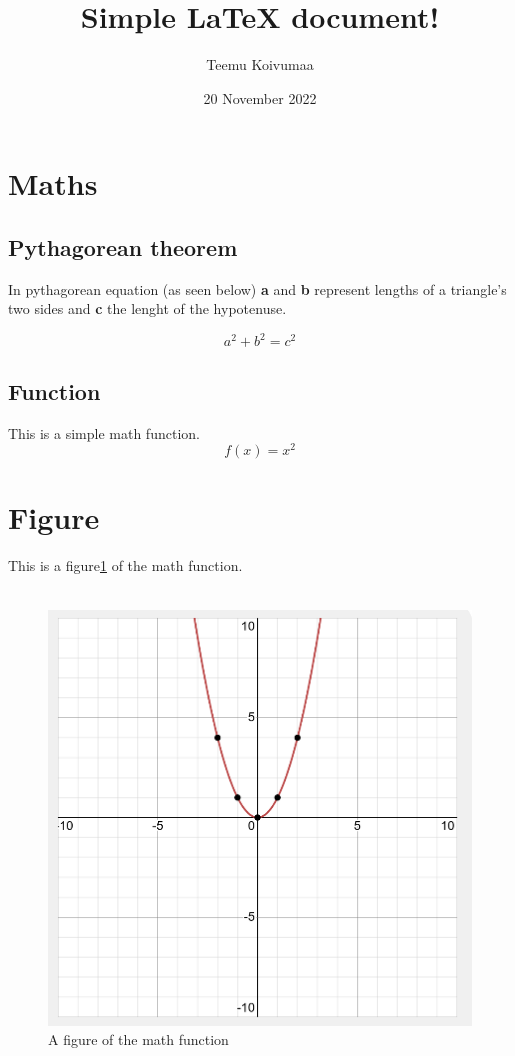 \documentclass{article}
\title{Simple LaTeX document!}
\author{Teemu Koivumaa}
\date{20 November 2022}
\begin{document}
\maketitle
\thispagestyle{empty}

\newpage
\tableofcontents
\thispagestyle{empty}

\newpage
{} 
\section{Maths}
\subsection{Pythagorean theorem}
In pythagorean equation (as seen below) \textbf{a} and \textbf{b} represent lengths of a triangle’s two sides and \textbf{c} the lenght of the hypotenuse.

\begin{equation}
a^2 + b^2 = c^2
\end{equation}

\subsection{Function}
This is a simple math function.
\begin{equation}
f(x) = x^2
\end{equation}

\section{Figure}
This is a figure\ref{fig:figure} of the math function.
\\
\\
\begin{figure}[h]
    \centering
    \includegraphics[scale=0.25]{FunctionGraph.png}
    \caption{A figure of the math function \cite{algebra_examples_2022}}
    \label{fig:figure}
\end{figure}
\end{document}
